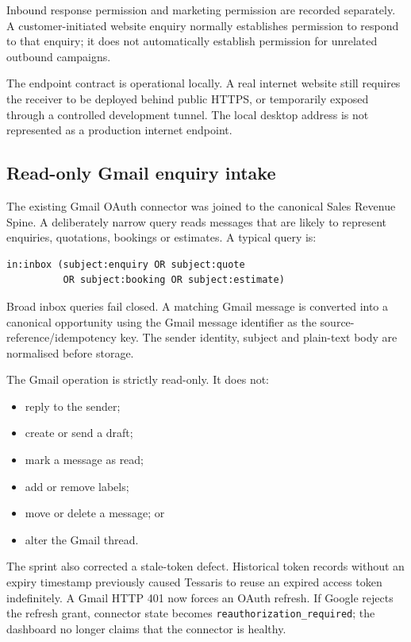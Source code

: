 Inbound response permission and marketing permission are recorded separately. A customer-initiated website enquiry normally establishes permission to respond to that enquiry; it does not automatically establish permission for unrelated outbound campaigns.

The endpoint contract is operational locally. A real internet website still requires the receiver to be deployed behind public HTTPS, or temporarily exposed through a controlled development tunnel. The local desktop address is not represented as a production internet endpoint.

\subsection{Read-only Gmail enquiry intake}

The existing Gmail OAuth connector was joined to the canonical Sales Revenue Spine. A deliberately narrow query reads messages that are likely to represent enquiries, quotations, bookings or estimates. A typical query is:

\begin{verbatim}
in:inbox (subject:enquiry OR subject:quote
          OR subject:booking OR subject:estimate)
\end{verbatim}

Broad inbox queries fail closed. A matching Gmail message is converted into a canonical opportunity using the Gmail message identifier as the source-reference/idempotency key. The sender identity, subject and plain-text body are normalised before storage.

The Gmail operation is strictly read-only. It does not:

\begin{itemize}[leftmargin=*]
    \item reply to the sender;
    \item create or send a draft;
    \item mark a message as read;
    \item add or remove labels;
    \item move or delete a message; or
    \item alter the Gmail thread.
\end{itemize}

The sprint also corrected a stale-token defect. Historical token records without an expiry timestamp previously caused Tessaris to reuse an expired access token indefinitely. A Gmail HTTP 401 now forces an OAuth refresh. If Google rejects the refresh grant, connector state becomes \texttt{reauthorization\_required}; the dashboard no longer claims that the connector is healthy.

